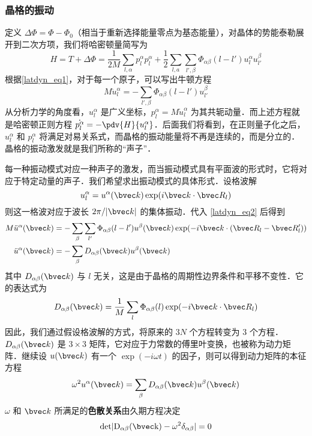 \subsubsection{晶格的振动}
定义 $\Delta \Phi=\Phi-\Phi_0$（相当于重新选择能量零点为基态能量），对晶体的势能泰勒展开到二次方项，我们将哈密顿量简写为
\begin{equation}
H=T+\Delta \Phi=\frac{1}{2M}\sum_{l,\alpha}p_l^\alpha p_l^\alpha + \frac{1}{2}\sum_{l,a}\sum_{l',\beta}\Phi_{\alpha\beta}(l-l')u_l^\alpha u_{l'}^\beta
\end{equation}
根据\autoref{latdyn_eq1}，对于每一个原子，可以写出牛顿方程
\begin{equation}\label{latdyn_eq2}
M \ddot{u}_l^\alpha = -\sum_{l',\beta}\Phi_{\alpha\beta}(l-l')u_{l'}^\beta
\end{equation}
从分析力学的角度看，$u_l^\alpha$ 是广义坐标，$p_l^\alpha=M\dot{u}_l^\alpha$ 为其共轭动量．而上述方程就是哈密顿正则方程 $\dot{p_l^\alpha}=-\pdv{H}{u_l^\alpha}$．后面我们将看到，在正则量子化之后，$u_l^\alpha$ 和 $p_l^\alpha$ 将满足对易关系式，而晶格的振动能量将不再是连续的，而是分立的．晶格的振动激发就是我们所称的“声子”．

每一种振动模式对应一种声子的激发，而当振动模式具有平面波的形式时，它将对应于特定动量的声子．我们希望求出振动模式的具体形式．设格波解
\begin{equation}
u_l^\alpha = u^\alpha(\bvec k) \exp(i\bvec k\cdot \bvec R_l)
\end{equation}
则这一格波对应于波长 $2\pi/|\bvec k|$ 的集体振动．代入 \autoref{latdyn_eq2} 后得到
\begin{equation}
\begin{aligned}
M\ddot{u}^\alpha(\bvec k)&=-\sum_{\beta}\sum_{l'}\Phi_{\alpha\beta}(l-l')u^\beta(\bvec k)\exp(-i\bvec k\cdot(\bvec R_l-\bvec R_l'))\\
\ddot{u}^\alpha(\bvec k)&=-\sum_{\beta}D_{\alpha\beta}(\bvec k)u^\beta(\bvec k)
\end{aligned}
\end{equation}
其中 $D_{\alpha\beta}(\bvec k)$ 与 $l$ 无关，这是由于晶格的周期性边界条件和平移不变性．它的表达式为
\begin{equation}
D_{\alpha\beta}(\bvec k)=\frac{1}{M}\sum_l \Phi_{\alpha\beta}(l)\exp(-i\bvec k\cdot \bvec R_l)
\end{equation}
因此，我们通过假设格波解的方式，将原来的 $3N$ 个方程转变为 $3$ 个方程．$D_{\alpha\beta}(\bvec k)$ 是 $3\times 3$ 矩阵，它对应于力常数的傅里叶变换，也被称为动力矩阵．继续设 $u(\bvec k)$ 有一个 $\exp(-i\omega t)$ 的因子，则可以得到动力矩阵的本征方程
\begin{equation}
\omega^2 u^\alpha(\bvec k)=\sum_{\beta}D_{\alpha\beta}(\bvec k)u^\beta(\bvec k)
\end{equation}
$\omega$ 和 $\bvec k$ 所满足的\textbf{色散关系}由久期方程决定
\begin{equation}
\rm{det} |D_{\alpha\beta}(\bvec k)-\omega^2\delta_{\alpha\beta}|=0
\end{equation}

